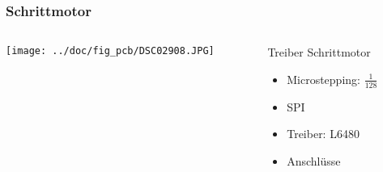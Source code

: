 \begin{frame}
    \frametitle{Schrittmotor}
    \begin{columns}
        \begin{column}{0.50\textwidth}
            \centering
            \texttt{[image: ../doc/fig\_pcb/DSC02908.JPG]}
        \end{column}
        \begin{column}{0.50\textwidth}
            \begin{block}{Treiber Schrittmotor}
                \begin{itemize}
                    \item Microstepping: $\frac{1}{128}$
                    \item SPI
                    \item Treiber: L6480
                    \item Anschlüsse
                \end{itemize}
            \end{block}
        \end{column}
    \end{columns}
\end{frame}

